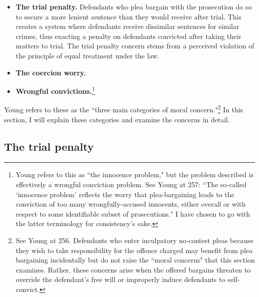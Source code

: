 \begin{itemize}
    \item \textbf{The trial penalty.} Defendants who plea bargain with the prosecution do so to secure a more lenient sentence than they would receive after trial. This creates a system where defendants receive dissimilar sentences for similar crimes, thus exacting a penalty on defendants convicted after taking their matters to trial. The trial penalty concern stems from a perceived violation of the principle of equal treatment under the law.
    \item \textbf{The coercion worry.} 
    \item \textbf{Wrongful convictions.}\footnote{Young refers to this as ``the innocence problem," but the problem described is effectively a wrongful conviction problem. See Young at 257: ``The so-called `innocence problem' reflects the worry that plea-bargaining leads to the conviction of too many wrongfully-accused innocents, either overall or with respect to some identifiable subset of prosecutions."  I have chosen to go with the latter terminology for consistency's sake.} 
\end{itemize}

Young refers to these as the ``three main categories of moral concern."\footnote{See Young at 256. Defendants who enter inculpatory no-contest pleas because they wish to take responsibility for the offence charged may benefit from plea bargaining incidentally but do not raise the ``moral concerns" that this section examines. Rather, these concerns arise when the offered bargains threaten to override the defendant's free will or improperly induce defendants to self-convict.} In this section, I will explain these categories and examine the concerns in detail. 

\subsection{The trial penalty}

